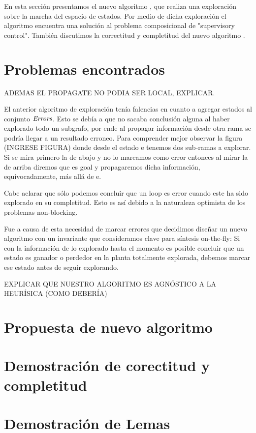 En esta sección presentamos el nuevo algoritmo \DCS, que realiza una exploración sobre la marcha del espacio de estados. Por medio de dicha exploración el algoritmo encuentra una solución al problema composicional de "supervisory control". También discutimos la correctitud y completitud del nuevo algoritmo \DCS. \\

\section{Problemas encontrados}

ADEMAS EL PROPAGATE NO PODIA SER LOCAL, EXPLICAR.

El anterior algoritmo de exploración tenía falencias en cuanto a agregar estados al conjunto $\mathit{Errors}$. Esto se debía a que no sacaba conclusión alguna al haber explorado todo un subgrafo, por ende al propagar información desde otra rama se podría llegar a un resultado erroneo. Para comprender mejor observar la figura (INGRESE FIGURA) donde desde el estado e tenemos dos sub-ramas a explorar. Si se mira primero la de abajo y no lo marcamos como error entonces al mirar la de arriba diremos que es goal y propagaremos dicha información, equivocadamente, más allá de e.

Cabe aclarar que sólo podemos concluir que un loop es error cuando este ha sido explorado en su completitud. Esto es así debido a la naturaleza optimista de los problemas non-blocking.

Fue a causa de esta necesidad de marcar errores que decidimos diseñar un nuevo algoritmo con un invariante que consideramos clave para síntesis on-the-fly: Si con la información de lo explorado hasta el momento es posible concluir que un estado es ganador o perdedor en la planta totalmente explorada, debemos marcar ese estado antes de seguir explorando.

EXPLICAR QUE NUESTRO ALGORITMO ES AGNÓSTICO A LA HEURÍSICA (COMO DEBERÍA)


\section{Propuesta de nuevo algoritmo}



\FloatBarrier

\section{Demostración de corectitud y completitud}


\section{Demostración de Lemas}

